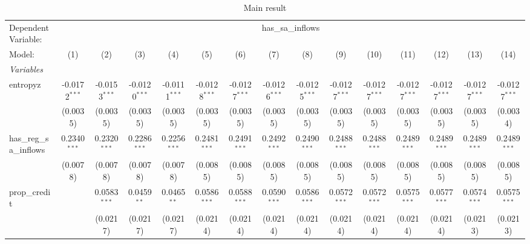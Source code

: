 
\begin{table}[htbp]
   \centering
   \caption{Main result}
   \begin{tabular}{lcccccccccccccc}
      \tabularnewline\midrule\midrule
      Dependent Variable: & \multicolumn{14}{c}{has\_sa\_inflows}\\
      Model:                   & (1)             & (2)             & (3)             & (4)             & (5)             & (6)             & (7)             & (8)             & (9)             & (10)            & (11)            & (12)            & (13)            & (14)\\
      \midrule \emph{Variables} &   &   &   &   &   &   &   &   &   &   &   &   &   &  \\
      entropyz                 & -0.0172$^{***}$ & -0.0153$^{***}$ & -0.0120$^{***}$ & -0.0111$^{***}$ & -0.0128$^{***}$ & -0.0127$^{***}$ & -0.0126$^{***}$ & -0.0125$^{***}$ & -0.0127$^{***}$ & -0.0127$^{***}$ & -0.0127$^{***}$ & -0.0127$^{***}$ & -0.0127$^{***}$ & -0.0127$^{***}$\\
                               & (0.0035)        & (0.0035)        & (0.0035)        & (0.0035)        & (0.0035)        & (0.0035)        & (0.0035)        & (0.0035)        & (0.0035)        & (0.0035)        & (0.0035)        & (0.0035)        & (0.0035)        & (0.0034)\\
      has\_reg\_sa\_inflows & 0.2340$^{***}$  & 0.2320$^{***}$  & 0.2286$^{***}$  & 0.2256$^{***}$  & 0.2481$^{***}$  & 0.2491$^{***}$  & 0.2492$^{***}$  & 0.2490$^{***}$  & 0.2488$^{***}$  & 0.2488$^{***}$  & 0.2489$^{***}$  & 0.2489$^{***}$  & 0.2489$^{***}$  & 0.2489$^{***}$\\
                               & (0.0078)        & (0.0078)        & (0.0078)        & (0.0078)        & (0.0085)        & (0.0085)        & (0.0085)        & (0.0085)        & (0.0085)        & (0.0085)        & (0.0085)        & (0.0085)        & (0.0085)        & (0.0085)\\
      prop\_credit            &                 & 0.0583$^{***}$  & 0.0459$^{**}$   & 0.0465$^{**}$   & 0.0586$^{***}$  & 0.0588$^{***}$  & 0.0590$^{***}$  & 0.0586$^{***}$  & 0.0572$^{***}$  & 0.0572$^{***}$  & 0.0575$^{***}$  & 0.0577$^{***}$  & 0.0574$^{***}$  & 0.0575$^{***}$\\
                               &                 & (0.0217)        & (0.0217)        & (0.0217)        & (0.0214)        & (0.0214)        & (0.0214)        & (0.0214)        & (0.0214)        & (0.0214)        & (0.0214)        & (0.0214)        & (0.0213)        & (0.0213)\\

\end{tabular}
\end{table}

